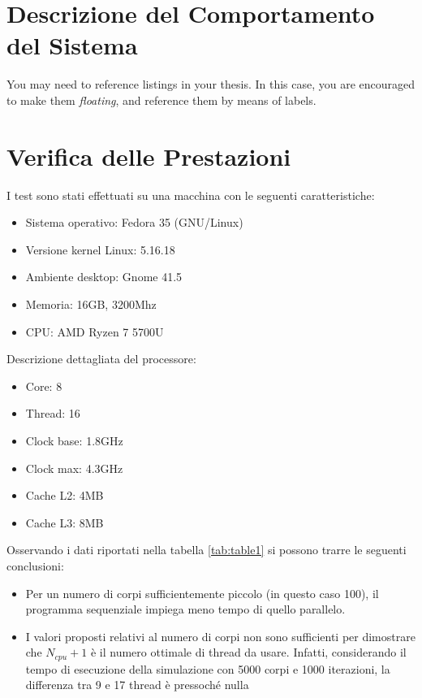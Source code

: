 \documentclass[12pt,a4paper,openright,twoside]{book}
\begin{document}
\chapter{Descrizione del Comportamento del Sistema} %
\label{chap:Descrizione del Comportamento del Sistema}

You may need to reference listings in your thesis.
%
In this case, you are encouraged to make them \emph{floating}, and reference them by means of labels.

\chapter{Verifica delle Prestazioni} %
\label{chap:Verifica delle Prestazioni}

I test sono stati effettuati su una macchina con le seguenti caratteristiche:
\begin{itemize}
	\item Sistema operativo: Fedora 35 (GNU/Linux)
	\item Versione kernel Linux: 5.16.18
	\item Ambiente desktop: Gnome 41.5
	\item Memoria: 16GB, 3200Mhz
	\item CPU: AMD Ryzen 7 5700U
\end{itemize}
Descrizione dettagliata del processore:
\begin{itemize}
	\item Core: 8
	\item Thread: 16
	\item Clock base: 1.8GHz
	\item Clock max: 4.3GHz
	\item Cache L2: 4MB
	\item Cache L3: 8MB
\end{itemize}

Osservando i dati riportati nella tabella \ref{tab:table1}
si possono trarre le seguenti conclusioni:
\begin{itemize}
	\item Per un numero di corpi sufficientemente piccolo (in questo caso 100),
	il programma sequenziale impiega meno tempo di quello parallelo.
	\item I valori proposti relativi al numero di corpi non sono sufficienti per dimostrare che $N_{cpu}+1$
	è il numero ottimale di thread da usare. Infatti, considerando il tempo di esecuzione della simulazione con 5000 corpi e 1000 iterazioni,
	la differenza tra 9 e 17 thread è pressoché nulla
\end{itemize}
\end{document}

